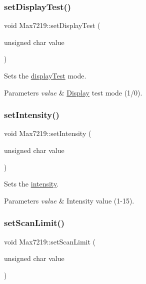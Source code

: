 \subsubsection{\texorpdfstring{set\+Display\+Test()}{setDisplayTest()}}
{\footnotesize\ttfamily void Max7219\+::set\+Display\+Test (\begin{DoxyParamCaption}\item[{unsigned char}]{value }\end{DoxyParamCaption})}

Sets the \hyperlink{classdrumpi_1_1Max7219_a203552d0f41ceb1366dbd8bbf1608110}{display\+Test} mode. 
\begin{DoxyParams}{Parameters}
{\em value} & \hyperlink{classdrumpi_1_1Display}{Display} test mode (1/0). \\
\hline
\end{DoxyParams}
\mbox{\label{classdrumpi_1_1Max7219_a7a722668b9b1d232792f6877171ca7c5}} 
\subsubsection{\texorpdfstring{set\+Intensity()}{setIntensity()}}
{\footnotesize\ttfamily void Max7219\+::set\+Intensity (\begin{DoxyParamCaption}\item[{unsigned char}]{value }\end{DoxyParamCaption})}

Sets the \hyperlink{classdrumpi_1_1Max7219_a22aa789cc1ac84c6c5df7ad59607afed}{intensity}. 
\begin{DoxyParams}{Parameters}
{\em value} & Intensity value (1-\/15). \\
\hline
\end{DoxyParams}
\mbox{\label{classdrumpi_1_1Max7219_a2d13fd1c5a05004cb69dbaef8f1fed3a}} 
\subsubsection{\texorpdfstring{set\+Scan\+Limit()}{setScanLimit()}}
{\footnotesize\ttfamily void Max7219\+::set\+Scan\+Limit (\begin{DoxyParamCaption}\item[{unsigned char}]{value }\end{DoxyParamCaption})}

